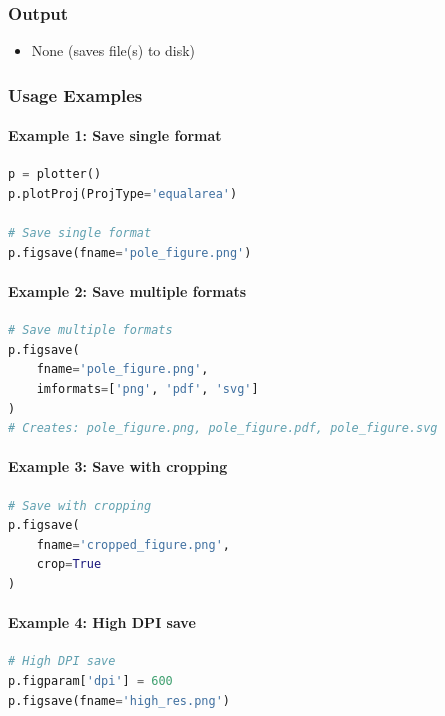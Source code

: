 \documentclass[11pt,a4paper]{article}
\begin{document}
\subsubsection{Output}
\begin{itemize}[leftmargin=*]
    \item None (saves file(s) to disk)
\end{itemize}

\subsubsection{Usage Examples}

\paragraph{Example 1: Save single format}
\begin{lstlisting}[language=Python, caption=Save to single format]
p = plotter()
p.plotProj(ProjType='equalarea')

# Save single format
p.figsave(fname='pole_figure.png')
\end{lstlisting}

\paragraph{Example 2: Save multiple formats}
\begin{lstlisting}[language=Python, caption=Save to multiple formats simultaneously]
# Save multiple formats
p.figsave(
    fname='pole_figure.png',
    imformats=['png', 'pdf', 'svg']
)
# Creates: pole_figure.png, pole_figure.pdf, pole_figure.svg
\end{lstlisting}

\paragraph{Example 3: Save with cropping}
\begin{lstlisting}[language=Python, caption=Save with automatic whitespace cropping]
# Save with cropping
p.figsave(
    fname='cropped_figure.png',
    crop=True
)
\end{lstlisting}

\paragraph{Example 4: High DPI save}
\begin{lstlisting}[language=Python, caption=High resolution output]
# High DPI save
p.figparam['dpi'] = 600
p.figsave(fname='high_res.png')
\end{lstlisting}
\end{document}
